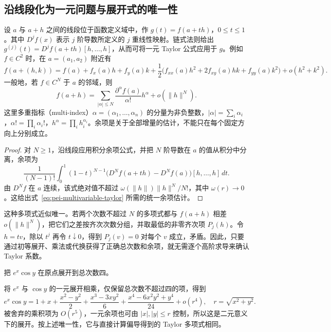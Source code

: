 \subsection{沿线段化为一元问题与展开式的唯一性}

设 $a$ 与 $a+h$ 之间的线段位于函数定义域中，作 $g(t)=f(a+th)$，$0\le t\le1$。其中 $D^jf(x)$ 表示 $j$ 阶导数所定义的 $j$ 重线性映射。链式法则给出 $g^{(j)}(t)=D^jf(a+th)[h,\ldots,h]$，从而可将一元 Taylor 公式应用于 $g$。例如 $f\in C^2$ 时，在 $a=(a_1,a_2)$ 附近有
\begin{equation}
\label{eq:pei-second-order-taylor}
f(a+(h,k))=f(a)+f_x(a)h+f_y(a)k+\frac12\bigl(f_{xx}(a)h^2+2f_{xy}(a)hk+f_{yy}(a)k^2\bigr)+o(h^2+k^2).
\end{equation}
一般地，若 $f\in C^N$ 于 $a$ 的邻域，则
\begin{equation}
\label{eq:pei-multivariable-taylor}
f(a+h)=\sum_{|\alpha|\le N}\frac{\partial^\alpha f(a)}{\alpha!}h^\alpha+o(\|h\|^N).
\end{equation}
这里多重指标（multi-index）$\alpha=(\alpha_1,\ldots,\alpha_n)$ 的分量为非负整数，$|\alpha|=\sum_i\alpha_i$，$\alpha!=\prod_i\alpha_i!$，$h^\alpha=\prod_i h_i^{\alpha_i}$。余项是关于全部增量的估计，不能只在每个固定方向上分别成立。

\begin{proof}
对 $N\ge1$，沿线段应用积分余项公式，并把 $N$ 阶导数在 $a$ 的值从积分中分离，余项为
\[
\frac1{(N-1)!}\int_0^1(1-t)^{N-1}\bigl(D^Nf(a+th)-D^Nf(a)\bigr)[h,\ldots,h]\,dt.
\]
由 $D^Nf$ 在 $a$ 连续，该式绝对值不超过 $\omega(\|h\|)\|h\|^N/N!$，其中 $\omega(r)\to0$。这给出式~\eqref{eq:pei-multivariable-taylor} 所需的统一余项估计。
\end{proof}

这种多项式近似唯一。若两个次数不超过 $N$ 的多项式都与 $f(a+h)$ 相差 $o(\|h\|^N)$，把它们之差按齐次次数分组，并取最低的非零齐次项 $P_j(h)$。令 $h=tv$，除以 $t^j$ 再令 $t\downarrow0$，得到 $P_j(v)=0$ 对每个 $v$ 成立，矛盾。因此，只要通过初等展开、乘法或代换获得了正确总次数和余项，就无需逐个高阶求导来确认 Taylor 系数。

\begin{example}
把 $e^x\cos y$ 在原点展开到总次数四。
\end{example}
\begin{solve}
将 $e^x$ 与 $\cos y$ 的一元展开相乘，仅保留总次数不超过四的项，得到
\[
e^x\cos y=1+x+\frac{x^2-y^2}{2}+\frac{x^3-3xy^2}{6}+\frac{x^4-6x^2y^2+y^4}{24}+o(r^4),\quad r=\sqrt{x^2+y^2}.
\]
被舍弃的乘积项为 $O(r^5)$，一元余项也可由 $|x|,|y|\le r$ 控制，所以这是二元意义下的展开。按上述唯一性，它与直接计算偏导得到的 Taylor 多项式相同。
\end{solve}

